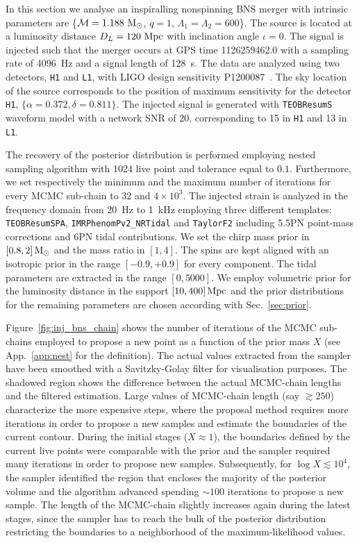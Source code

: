 \documentclass[prd,aps,twocolumn,a4paper,showkeys,nofootinbib,floatfix]{revtex4-1}
\def\M{\mathcal{M}}
\def\Mo{{\rm M_{\odot}}}
\begin{document}
In this section we analyse an inspiralling nonspinning BNS merger with intrinsic parameters are
\{$\M = 1.188~\Mo$, $q=1$, $\Lambda_1=\Lambda_2 = 600$\}.
The source is located at a luminosity distance 
$D_L=120~{\rm Mpc}$ with inclination angle $\iota=0$.
The signal is injected such that the merger occurs at GPS time 1126259462.0
with a sampling rate of 4096~Hz and a signal length of 128~s.
The data are analyzed using two detectors, {\tt H1} and {\tt L1}, with LIGO design sensitivity P1200087~\cite{TheLIGOScientific:2014jea,Aasi:2013wya,Harry:2010zz}.
The sky location of the source corresponds to the position of 
maximum sensitivity for the detector {\tt H1}, 
$\{\alpha=0.372, \delta=0.811\}$.
The injected signal is generated with {\tt TEOBResumS} waveform model
with a network SNR of 20, 
corresponding to 15 in {\tt H1} and 13 in {\tt L1}.

The recovery of the posterior distribution is performed employing nested sampling algorithm
with 1024 live point and tolerance equal to $0.1$.
Furthermore, we set respectively the minimum and the maximum number
of iterations for every MCMC sub-chain to 32 and $4{\times} 10^{3}$.
The injected strain is analyzed 
in the frequency domain from 20~Hz to 1~kHz
employing three different templates:
{\tt TEOBResumSPA}, {\tt IMRPhenomPv2\_NRTidal} and 
{\tt TaylorF2} including 5.5PN point-mass corrections 
and 6PN tidal contributions.
We set the chirp mass prior in $[0.8, 2]\,\Mo$ and the mass ratio in $[1,4]$.
The spins are kept aligned with an isotropic prior in the range $[-0.9,+0.9]$ for every component.
The tidal parameters are extracted in the range $[0,5000]$.
We employ volumetric prior for the luminosity distance 
in the support $[10,400]\,{\rm Mpc}$
and the prior distributions for the remaining parameters are chosen 
according with Sec.~\ref{sec:prior}.

Figure~\ref{fig:inj_bns_chain} shows the number of iterations of the 
MCMC sub-chains employed to propose a new point as a function of the 
prior mass $X$ (see App.~\ref{app:nest} for the definition).
The actual values extracted from the sampler 
have been smoothed with a Savitzky-Golay filter for visualisation purposes.
The shadowed region shows the difference between the actual MCMC-chain lengths
and the filtered estimation.
Large values of MCMC-chain length (say $\gtrsim 250$) characterize
the more expensive steps, where the proposal method requires
more iterations in order to propose a new samples and estimate the 
boundaries of the current contour.
During the initial stages ($X {\approx} 1$), the boundaries defined by the current live points 
were comparable with the prior and 
the sampler required many iterations in order to propose new samples.
Subsequently, for $\log X \lesssim 10^{4}$, 
the sampler identified the region that encloses the majority of the posterior volume
and the algorithm advanced spending ${\sim}100$ iterations to propose a new sample. 
The length of the MCMC-chain slightly increases again 
during the latest stages, since the sampler has to reach
the bulk of the posterior distribution
restricting the boundaries to a neighborhood 
of the maximum-likelihood values.
\end{document}
